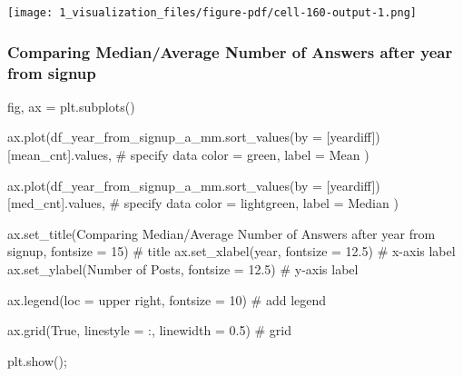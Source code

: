 \documentclass[
  letterpaper,
  DIV=11,
  numbers=noendperiod]{scrartcl}
\newenvironment{Shaded}{\begin{snugshade}}{\end{snugshade}}
\newcommand{\CommentTok}[1]{\textcolor[rgb]{0.37,0.37,0.37}{#1}}
\newcommand{\DecValTok}[1]{\textcolor[rgb]{0.68,0.00,0.00}{#1}}
\newcommand{\FloatTok}[1]{\textcolor[rgb]{0.68,0.00,0.00}{#1}}
\newcommand{\NormalTok}[1]{\textcolor[rgb]{0.00,0.23,0.31}{#1}}
\newcommand{\OperatorTok}[1]{\textcolor[rgb]{0.37,0.37,0.37}{#1}}
\newcommand{\StringTok}[1]{\textcolor[rgb]{0.13,0.47,0.30}{#1}}
\newcommand{\VariableTok}[1]{\textcolor[rgb]{0.07,0.07,0.07}{#1}}
\begin{document}
\texttt{[image: 1\_visualization\_files/figure-pdf/cell-160-output-1.png]}

\subsubsection{Comparing Median/Average Number of Answers after year
from
signup}\label{comparing-medianaverage-number-of-answers-after-year-from-signup}

\begin{Shaded}
\begin{Highlighting}[]
\NormalTok{fig, ax }\OperatorTok{=}\NormalTok{ plt.subplots()}


\NormalTok{ax.plot(df\_year\_from\_signup\_a\_mm.sort\_values(by }\OperatorTok{=}\NormalTok{ [}\StringTok{\textquotesingle{}yeardiff\textquotesingle{}}\NormalTok{])[}\StringTok{\textquotesingle{}mean\_cnt\textquotesingle{}}\NormalTok{].values, }\CommentTok{\# specify data}
\NormalTok{        color }\OperatorTok{=} \StringTok{\textquotesingle{}green\textquotesingle{}}\NormalTok{,}
\NormalTok{        label }\OperatorTok{=} \StringTok{\textquotesingle{}Mean\textquotesingle{}}
\NormalTok{) }

\NormalTok{ax.plot(df\_year\_from\_signup\_a\_mm.sort\_values(by }\OperatorTok{=}\NormalTok{ [}\StringTok{\textquotesingle{}yeardiff\textquotesingle{}}\NormalTok{])[}\StringTok{\textquotesingle{}med\_cnt\textquotesingle{}}\NormalTok{].values, }\CommentTok{\# specify data}
\NormalTok{        color }\OperatorTok{=} \StringTok{\textquotesingle{}lightgreen\textquotesingle{}}\NormalTok{,}
\NormalTok{        label }\OperatorTok{=} \StringTok{\textquotesingle{}Median\textquotesingle{}}
\NormalTok{) }



\NormalTok{ax.set\_title(}\StringTok{\textquotesingle{}Comparing Median/Average Number of Answers after year from signup\textquotesingle{}}\NormalTok{, fontsize }\OperatorTok{=} \DecValTok{15}\NormalTok{) }\CommentTok{\# title}
\NormalTok{ax.set\_xlabel(}\StringTok{\textquotesingle{}year\textquotesingle{}}\NormalTok{, fontsize }\OperatorTok{=} \FloatTok{12.5}\NormalTok{) }\CommentTok{\# x{-}axis label}
\NormalTok{ax.set\_ylabel(}\StringTok{\textquotesingle{}Number of Posts\textquotesingle{}}\NormalTok{, fontsize }\OperatorTok{=} \FloatTok{12.5}\NormalTok{) }\CommentTok{\# y{-}axis label}

\NormalTok{ax.legend(loc }\OperatorTok{=} \StringTok{\textquotesingle{}upper right\textquotesingle{}}\NormalTok{, fontsize }\OperatorTok{=} \DecValTok{10}\NormalTok{) }\CommentTok{\# add legend}

\NormalTok{ax.grid(}\VariableTok{True}\NormalTok{, linestyle }\OperatorTok{=} \StringTok{\textquotesingle{}:\textquotesingle{}}\NormalTok{, linewidth }\OperatorTok{=} \FloatTok{0.5}\NormalTok{) }\CommentTok{\# grid}

\NormalTok{plt.show()}\OperatorTok{;}
\end{Highlighting}
\end{Shaded}
\end{document}
